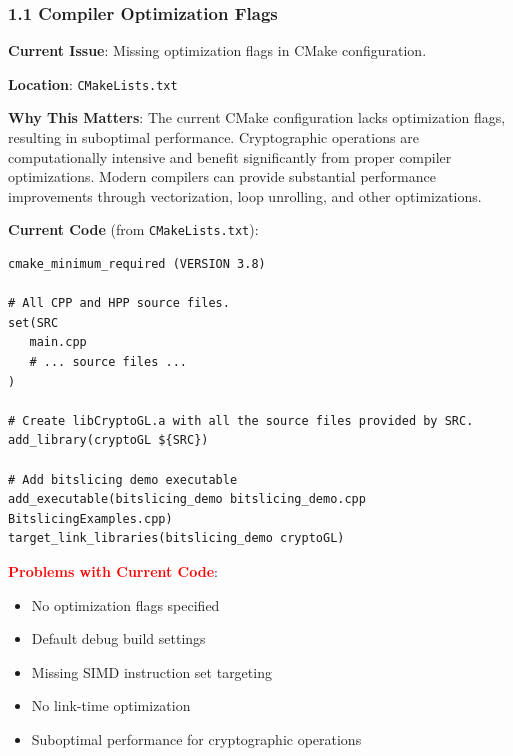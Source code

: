 \documentclass[11pt,a4paper]{article}
\begin{document}
\subsubsection{1.1 Compiler Optimization Flags}

\textbf{Current Issue}: Missing optimization flags in CMake configuration.

\textbf{Location}: \texttt{CMakeLists.txt}

\textbf{Why This Matters}: The current CMake configuration lacks optimization flags, resulting in suboptimal performance. Cryptographic operations are computationally intensive and benefit significantly from proper compiler optimizations. Modern compilers can provide substantial performance improvements through vectorization, loop unrolling, and other optimizations.

\textbf{Current Code} (from \texttt{CMakeLists.txt}):
\begin{lstlisting}
cmake_minimum_required (VERSION 3.8)

# All CPP and HPP source files.
set(SRC
   main.cpp
   # ... source files ...
)

# Create libCryptoGL.a with all the source files provided by SRC.
add_library(cryptoGL ${SRC})

# Add bitslicing demo executable
add_executable(bitslicing_demo bitslicing_demo.cpp BitslicingExamples.cpp)
target_link_libraries(bitslicing_demo cryptoGL)
\end{lstlisting}

\textcolor{red}{\textbf{Problems with Current Code}}:
\begin{itemize}
    \item No optimization flags specified
    \item Default debug build settings
    \item Missing SIMD instruction set targeting
    \item No link-time optimization
    \item Suboptimal performance for cryptographic operations
\end{itemize}
\end{document}

